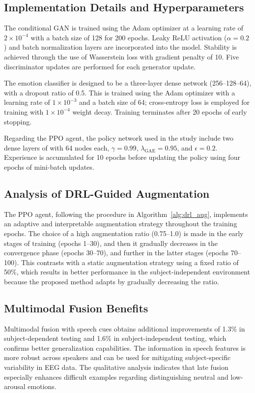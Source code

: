 \documentclass[conference]{IEEEtran}
\begin{document}
\subsection{Implementation Details and Hyperparameters}

The conditional GAN is trained using the Adam optimizer at a learning rate of $2 \times 10^{-4}$ with a batch size of 128 for 200 epochs. Leaky ReLU activation ($\alpha = 0.2$) and batch normalization layers are incorporated into the model. Stability is achieved through the use of Wasserstein loss with gradient penalty of 10. Five discriminator updates are performed for each generator update.

The emotion classifier is designed to be a three-layer dense network (256–128–64), with a dropout ratio of 0.5. This is trained using the Adam optimizer with a learning rate of $1 \times 10^{-3}$ and a batch size of 64; cross-entropy loss is employed for training with $1 \times 10^{-4}$ weight decay. Training terminates after 20 epochs of early stopping.

Regarding the PPO agent, the policy network used in the study include two dense layers of with 64 nodes each, $\gamma = 0.99$, $\lambda_{\text{GAE}} = 0.95$, and $\epsilon = 0.2$. Experience is accumulated for 10 epochs before updating the policy using four epochs of mini-batch updates.

\subsection{Analysis of DRL-Guided Augmentation}

The PPO agent, following the procedure in Algorithm~\ref{alg:drl_aug}, implements an adaptive and interpretable augmentation strategy throughout the training epochs. The choice of a high augmentation ratio (0.75--1.0) is made in the early stages of training (epochs 1--30), and then it gradually decreases in the convergence phase (epochs 30--70), and further in the latter stages (epochs 70--100). This contrasts with a static augmentation strategy using a fixed ratio of 50\%, which results in better performance in the subject-independent environment because the proposed method adapts by gradually decreasing the ratio.


\subsection{Multimodal Fusion Benefits}

Multimodal fusion with speech cues obtains additional improvements of 1.3\% in subject-dependent testing and 1.6\% in subject-independent testing, which confirms better generalization capabilities. The information in speech features is more robust across speakers and can be used for mitigating subject-specific variability in EEG data. The qualitative analysis indicates that late fusion especially enhances difficult examples regarding distinguishing neutral and low-arousal emotions.
\end{document}
